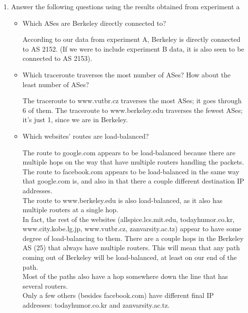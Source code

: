 \documentclass[10pt]{article}
\begin{document}
\begin{enumerate}

\item Answer the following questions using the results obtained from experiment a

\begin{itemize}

\item Which ASes are Berkeley directly connected to?

According to our data from experiment A, Berkeley is directly connected to AS 2152.  (If we were to include experiment B data, it is also seen to be connected to AS 2153).

\item Which traceroute traverses the most number of ASes? How about the least number of ASes?

The traceroute to www.vutbr.cz traverses the most ASes; it goes through 6 of them.  The traceroute to www.berkeley.edu traverses the fewest ASes; it's just 1, since we are in Berkeley.

\item Which websites' routes are load-balanced?

The route to google.com appears to be load-balanced because there are multiple hops on the way that have multiple routers handling the packets. \\

The route to facebook.com appears to be load-balanced in the same way that google.com is, and also in that there a couple different destination IP addresses. \\

The route to www.berkeley.edu is also load-balanced, as it also has multiple routers at a single hop. \\

In fact, the rest of the websites (allspice.lcs.mit.edu, todayhumor.co.kr, www.city.kobe.lg.jp, www.vutbr.cz, zanvarsity.ac.tz) appear to have some degree of load-balancing to them.  There are a couple hops in the Berkeley AS (25) that always have multiple routers.  This will mean that any path coming out of Berkeley will be load-balanced, at least on our end of the path. \\

Most of the paths also have a hop somewhere down the line that has several routers. \\

Only a few others (besides facebook.com) have different final IP addresses: todayhumor.co.kr and zanvarsity.ac.tz.


\end{itemize}
\end{enumerate}
\end{document}
